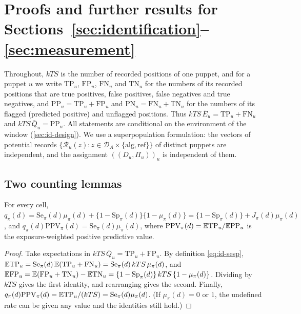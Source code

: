 \providecommand{\Se}{\mathrm{Se}}
\providecommand{\Sp}{\mathrm{Sp}}
\providecommand{\PPV}{\mathrm{PPV}}
\providecommand{\FOR}{\mathrm{FOR}}

\section{Proofs and further results for Sections~\ref{sec:identification}--\ref{sec:measurement}}\label{app:proofs-design}

Throughout, $kTS$ is the number of recorded positions of one puppet, and for a puppet $u$ we write $\mathrm{TP}_u$, $\mathrm{FP}_u$, $\mathrm{FN}_u$ and $\mathrm{TN}_u$ for the numbers of its recorded positions that are true positives, false positives, false negatives and true negatives, and $\mathrm{PP}_u=\mathrm{TP}_u+\mathrm{FP}_u$ and $\mathrm{PN}_u=\mathrm{FN}_u+\mathrm{TN}_u$ for the numbers of its flagged (predicted positive) and unflagged positions. Thus $kTS\,\bar E_u=\mathrm{TP}_u+\mathrm{FN}_u$ and $kTS\,\bar Q_u=\mathrm{PP}_u$. All statements are conditional on the environment of the window (\cref{sec:id-design}). We use a superpopulation formulation: the vectors of potential records $\{\mathcal R_u(z):z\in\mathcal D_A\times\{\mathrm{alg},\mathrm{ref}\}\}$ of distinct puppets are independent, and the assignment $((D_u,\Pi_u))_u$ is independent of them.

\subsection{Two counting lemmas}\label{app:pf-lemmas}

\begin{lemma}\label{lem:id-count}
For every cell, $q_\pi(d)=\Se_\pi(d)\mu_\pi(d)+\{1-\Sp_\pi(d)\}\{1-\mu_\pi(d)\}=\{1-\Sp_\pi(d)\}+J_\pi(d)\mu_\pi(d)$, and $q_\pi(d)\PPV_\pi(d)=\Se_\pi(d)\mu_\pi(d)$, where $\PPV_\pi(d)=\E\mathrm{TP}_u/\E\mathrm{PP}_u$ is the exposure-weighted positive predictive value.
\end{lemma}

\begin{proof}
Take expectations in $kTS\,\bar Q_u=\mathrm{TP}_u+\mathrm{FP}_u$. By definition \eqref{eq:id-sesp}, $\E\mathrm{TP}_u=\Se_\pi(d)\,\E(\mathrm{TP}_u+\mathrm{FN}_u)=\Se_\pi(d)\,kTS\,\mu_\pi(d)$, and $\E\mathrm{FP}_u=\E(\mathrm{FP}_u+\mathrm{TN}_u)-\E\mathrm{TN}_u=\{1-\Sp_\pi(d)\}\,kTS\,\{1-\mu_\pi(d)\}$. Dividing by $kTS$ gives the first identity, and rearranging gives the second. Finally, $q_\pi(d)\PPV_\pi(d)=\E\mathrm{TP}_u/(kTS)=\Se_\pi(d)\mu_\pi(d)$. (If $\mu_\pi(d)=0$ or $1$, the undefined rate can be given any value and the identities still hold.)
\end{proof}

